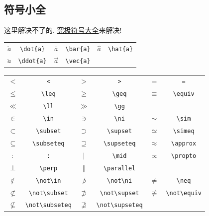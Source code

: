 \documentclass{ctexart}
\begin{document}
    \subsection{符号小全}
    这里解决不了的, \href{https://www.ctan.org/tex-archive/info/symbols/comprehensive}{究极符号大全}来解决!
    \begin{table}[!htbp]
        \centering
        \begin{tabular}{cccccc}
            $\dot{a}$ & \verb|\dot{a}| &
            $\bar{a}$ & \verb|\bar{a}| &
            $\hat{a}$ & \verb|\hat{a}| \\
            $\ddot{a}$ & \verb|\ddot{a}| &
            $\vec{a}$ & \verb|\vec{a}| \\
        \end{tabular}
    \end{table}
    \begin{table}[!htbp]
        \centering
        \begin{tabular}{cccccc}
            $<$ & \verb|<| &
            $>$ & \verb|>| &
            $=$ & \verb|=| \\
            $\leq$ & \verb|\leq| &
            $\geq$ & \verb|\geq| &
            $\equiv$ & \verb|\equiv| \\
            $\ll$ & \verb|\ll| &
            $\gg$ & \verb|\gg| \\
            $\in$ & \verb|\in| &
            $\ni$ & \verb|\ni| &
            $\sim$ & \verb|\sim| \\
            $\subset$ & \verb|\subset| &
            $\supset$ & \verb|\supset| &
            $\simeq$ & \verb|\simeq| \\
            $\subseteq$ & \verb|\subseteq| &
            $\supseteq$ & \verb|\supseteq| &
            $\approx$ & \verb|\approx| \\
            $:$ & \verb|:| &
            $\mid$ & \verb|\mid| &
            $\propto$ & \verb|\propto| \\
            $\perp$ & \verb|\perp| &
            $\parallel$ & \verb|\parallel| \\
            $\not\in$ & \verb|\not\in| &
            $\not\ni$ & \verb|\not\ni| &
            $\neq$ & \verb|\neq| \\
            $\not\subset$ & \verb|\not\subset| &
            $\not\supset$ & \verb|\not\supset| &
            $\not\equiv$ & \verb|\not\equiv| \\
            $\not\subseteq$ & \verb|\not\subseteq| &
            $\not\supseteq$ & \verb|\not\supseteq| \\
        \end{tabular}
    \end{table}
\end{document}
